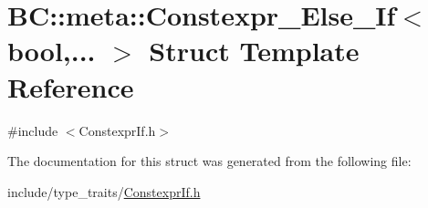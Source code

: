 \hypertarget{structBC_1_1meta_1_1Constexpr__Else__If}{}\section{BC\+:\+:meta\+:\+:Constexpr\+\_\+\+Else\+\_\+\+If$<$ bool,... $>$ Struct Template Reference}
\label{structBC_1_1meta_1_1Constexpr__Else__If}


{\ttfamily \#include $<$Constexpr\+If.\+h$>$}



The documentation for this struct was generated from the following file\+:\begin{DoxyCompactItemize}
\item 
include/type\+\_\+traits/\hyperlink{ConstexprIf_8h}{Constexpr\+If.\+h}\end{DoxyCompactItemize}
